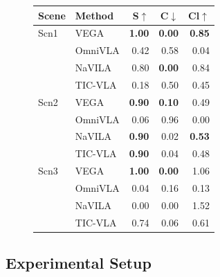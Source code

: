 \begin{figure}[t]
\begin{minipage}[t]{0.22\textwidth}
        \scriptsize
        \setlength{\tabcolsep}{1.5pt}
        \renewcommand{\arraystretch}{1.22}

        \begin{tabular}{llrrr}
        \toprule
        Scene & Method & S$\uparrow$ & C$\downarrow$ & Cl$\uparrow$ \\
        \midrule
        Scn1 & VEGA & \textbf{1.00} & \textbf{0.00} & \textbf{0.85} \\
           & OmniVLA     & 0.42 & 0.58 & 0.04 \\
           & NaVILA      & 0.80 & \textbf{0.00} & 0.84 \\
           & TIC-VLA     & 0.18 & 0.50 & 0.45 \\
        \midrule
        Scn2 & VEGA & \textbf{0.90} & \textbf{0.10} & 0.49 \\
           & OmniVLA     & 0.06 & 0.96 & 0.00 \\
           & NaVILA      & \textbf{0.90} & 0.02 & \textbf{0.53} \\
           & TIC-VLA     & \textbf{0.90} & 0.04 & 0.48 \\
        \midrule
        Scn3 & VEGA & \textbf{1.00} & \textbf{0.00} & 1.06 \\
           & OmniVLA     & 0.04 & 0.16 & 0.13 \\
           & NaVILA      & 0.00 & 0.00 & 1.52 \\
           & TIC-VLA     & 0.74 & 0.06 & 0.61 \\
        \bottomrule
        \end{tabular}

        \label{tab:isaac_sim}
    \end{minipage}

    \vspace{-4ex}
\end{figure}
\subsection{Experimental Setup}

